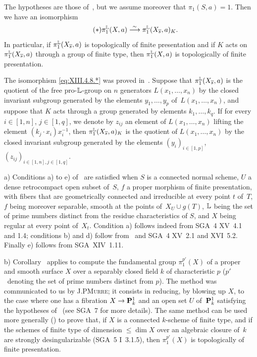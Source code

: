 \begin{corollary} \label{XIII.4.8}
The hypotheses are those of~, but we assume moreover
that $\pi_1(S,a)=1$. Then we have an isomorphism
\begin{equation*}
\label{eq:XIII.4.8.*} \tag{$*$}
{}\pi_1^{\mathbb{L}}(X,a)\overset{\sim}{\longrightarrow}\pi_1^{\mathbb{L}}(X_{\overline{s}},a)_K.
\end{equation*}
In particular, if $\pi_1^{\mathbb{L}}(X_{\overline{s}},a)$ is topologically of
finite presentation and if $K$ acts on~$\pi_1^{\mathbb{L}}(X_{\overline{s}},a)$ through a group of finite
type, then $\pi_1^{\mathbb{L}}(X,a)$ is topologically of finite
presentation.
\end{corollary}

The isomorphism \eqref{eq:XIII.4.8.*} was proved
in~. Suppose that $\pi_1^{\mathbb{L}}(X_{\overline{s}},a)$ is the quotient
of the free pro-$\mathbb{L}$-group on $n$ generators
$L(x_1,\dots,x_n)$ by the closed invariant subgroup generated
by the elements $y_1,\dots,y_p$ of~$L(x_1,\dots,x_n)$, and
suppose that $K$ acts through a group
generated by elements $k_1,\dots,k_q$. If for every
$i\in[1,n]$, $j\in[1,q]$, we denote by $z_{ij}$ an element of
$L(x_1,\dots,x_n)$ lifting the element $(k_j\cdot
x_i)x_i^{-1}$, then $\pi_1^{\mathbb{L}}(X_{\overline{s}},a)_K$ is the quotient of
$L(x_1,\dots,x_n)$ by the closed invariant subgroup generated
by the elements $(y_i)_{i\in[1,p]}$,
$(z_{ij})_{i\in[1,n],j\in[1,q]}$.

\begin{remarks}
\label{rem:XIII.4.6}
a) Conditions a) to e) of~ are
satisfied when $S$ is a connected normal scheme, $U$ a
dense retrocompact open subset of~$S$, $f$ a proper morphism of
finite presentation, with fibers that are geometrically connected
and irreducible at every point $t$ of~$T$, $f$ being moreover
separable,
smooth at the points of~$X_U\cup g(T)$, $\mathbb{L}$ being the set of
prime numbers distinct from the residue characteristics of
$S$, and $X$ being regular at every point of~$X_t$. Condition
a) follows indeed from SGA~4 XV~4.1 and 1.4; conditions
b) and d) follow from~ and SGA~4 XV~2.1 and
XVI~5.2. Finally e) follows from SGA~XIV~1.11.
\par\smallskip
b) Corollary~ applies to compute the
fundamental group $\pi_1^{p'}(X)$ of a proper and smooth surface $X$
over a separably closed field $k$ of characteristic $p$
($p'$~denoting the set of prime numbers distinct from
$p$). The method was communicated to us by
J.P\ptbl \textsc{Murre}; it consists in reducing, by blowing up
$X$, to the case where one has a fibration $X\to\PP^1_k$ and an open set $U$
of~$\mathbf{P}^1_k$ satisfying the hypotheses of~ (see
SGA~7 for more details). The same method can be
used more generally (\loccit) to prove that, if
$X$ is a connected $k$-scheme of finite type, and if the schemes
of finite type of dimension $\leq\dim X$ over an algebraic
closure of~$k$ are strongly desingularizable
(SGA~5 I~3.1.5), then $\pi_1^{p'}(X)$ is topologically of
finite presentation.
\end{remarks}
